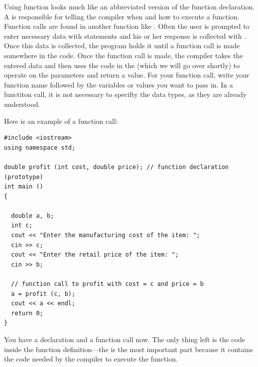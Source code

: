 Using function looks much like an abbreviated version of the function declaration. 
A  is responsible for telling the compiler when and how to execute a function.
Function calls are found in another function like . 
Often the user is prompted to enter necessary data with  statements and his or her response is collected with . 
Once this data is collected, the program holds it until a function call is made somewhere in the code.
Once the function call is made, the compiler takes the entered data and then uses the code in the  (which we will go over shortly) to operate on the parameters and return a value. 
For your function call, write your function name followed by the variables or values you want to pass in.
In a functiton call, it is not necessary to specifty the data types, as they are already understood.
 
Here is an example of a function call:

\noindent\begin{minipage}{\linewidth}\begin{lstlisting}
#include <iostream>
using namespace std;
 
double profit (int cost, double price); // function declaration (prototype)
int main ()
{
 
  double a, b;
  int c;
  cout << "Enter the manufacturing cost of the item: ";
  cin >> c;
  cout << "Enter the retail price of the item: ";
  cin >> b;
 
  // function call to profit with cost = c and price = b
  a = profit (c, b); 
  cout << a << endl;
  return 0;
}
\end{lstlisting}\end{minipage}
  
You have a declaration and a function call now. 
The only thing left is the code inside the function definition---the  is the most important part because it contains the code needed by the compiler to execute the function.

